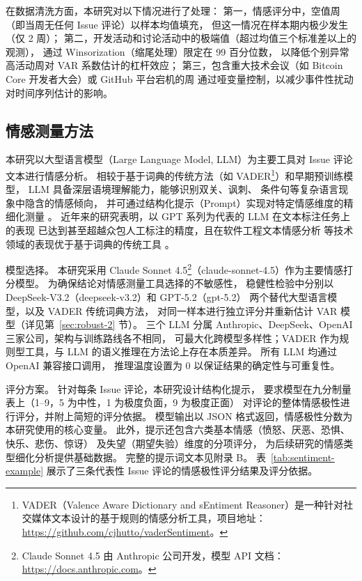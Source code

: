 \documentclass[
    type = master, %
    degree = professional,        %
    decl-page,  %
    twoside,                %
    fontset = fandol %
  ]{njuthesis}
\begin{document}
在数据清洗方面，本研究对以下情况进行了处理：
第一，情感评分中，空值周（即当周无任何 Issue 评论）以样本均值填充，
但这一情况在样本期内极少发生（仅 2 周）；
第二，开发活动和讨论活动中的极端值（超过均值三个标准差以上的观测），
通过 Winsorization（缩尾处理）限定在 99 百分位数，
以降低个别异常高活动周对 VAR 系数估计的杠杆效应；
第三，包含重大技术会议（如 Bitcoin Core 开发者大会）或 GitHub 平台宕机的周
通过哑变量控制，以减少事件性扰动对时间序列估计的影响。

\subsection{情感测量方法}

本研究以大型语言模型（Large Language Model, LLM）为主要工具对 Issue 评论文本进行情感分析。
相较于基于词典的传统方法（如 VADER\footnote{VADER（Valence Aware Dictionary and sEntiment Reasoner）是一种针对社交媒体文本设计的基于规则的情感分析工具，项目地址：\url{https://github.com/cjhutto/vaderSentiment}。}）和早期预训练模型，
LLM 具备深层语境理解能力，能够识别双关、讽刺、
条件句等复杂语言现象中隐含的情感倾向，
并可通过结构化提示（Prompt）实现对特定情感维度的精细化测量
\cite{gilardi2023chatgpt}。
近年来的研究表明，以 GPT 系列为代表的 LLM 在文本标注任务上的表现
已达到甚至超越众包人工标注的精度，且在软件工程文本情感分析
等技术领域的表现优于基于词典的传统工具
\cite{zhang2020sentiment}。

模型选择。
本研究采用 Claude Sonnet 4.5\footnote{Claude Sonnet 4.5 由 Anthropic 公司开发，模型 API 文档：\url{https://docs.anthropic.com}。}（claude-sonnet-4.5）作为主要情感打分模型。
为确保结论对情感测量工具选择的不敏感性，
稳健性检验中分别以 DeepSeek-V3.2（deepseek-v3.2）和 GPT-5.2（gpt-5.2）
两个替代大型语言模型，以及 VADER 传统词典方法，
对同一样本进行独立评分并重新估计 VAR 模型（详见第~\ref{sec:robust-2} 节）。
三个 LLM 分属 Anthropic、DeepSeek、OpenAI 三家公司，架构与训练路线各不相同，
可最大化跨模型多样性；VADER 作为规则型工具，与 LLM 的语义推理在方法论上存在本质差异。
所有 LLM 均通过 OpenAI 兼容接口调用，
推理温度设置为 0 以保证结果的确定性与可重复性。

评分方案。
针对每条 Issue 评论，本研究设计结构化提示，
要求模型在九分制量表上（1--9，5 为中性，1 为极度负面，9 为极度正面）
对评论的整体情感极性进行评分，并附上简短的评分依据。
模型输出以 JSON 格式返回，情感极性分数为本研究使用的核心变量。
此外，提示还包含六类基本情感（愤怒、厌恶、恐惧、快乐、悲伤、惊讶）
及失望（期望失验）维度的分项评分，
为后续研究的情感类型细化分析提供基础数据。
完整的提示词文本见附录 B。
表~\ref{tab:sentiment-example} 展示了三条代表性 Issue 评论的情感极性评分结果及评分依据。
\end{document}
